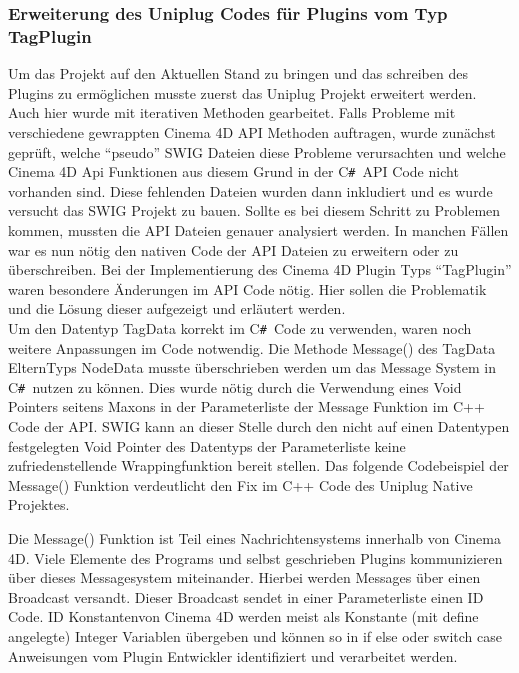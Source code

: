 \documentclass[pagesize, paper=a4, fontsize=12pt, titlepage=true, headings=small, headnosepline, abstractoff, liststotoc, nochapterprefix, plainheadsepline, twoside]{scrreprt}
\newcommand{\CSS}{C\texttt{\# }}
\begin{document}
\subsubsection{Erweiterung des Uniplug Codes für Plugins vom Typ TagPlugin}
Um das Projekt auf den Aktuellen Stand zu bringen und das schreiben des Plugins zu ermöglichen musste zuerst das Uniplug Projekt erweitert werden. Auch hier wurde mit iterativen Methoden gearbeitet. Falls Probleme mit verschiedene gewrappten Cinema 4D API Methoden auftragen, wurde zunächst geprüft, welche “pseudo” SWIG Dateien diese Probleme verursachten und welche Cinema 4D Api Funktionen aus diesem Grund in der \CSS API Code nicht vorhanden sind. Diese fehlenden Dateien wurden dann inkludiert und es wurde versucht das SWIG Projekt zu bauen. Sollte es bei diesem Schritt zu Problemen kommen, mussten die API Dateien genauer analysiert werden. In manchen Fällen war es nun nötig den nativen Code der API Dateien zu erweitern oder zu überschreiben. Bei der Implementierung des Cinema 4D Plugin Typs “TagPlugin” waren besondere Änderungen im API Code nötig. Hier sollen die Problematik und die Lösung dieser aufgezeigt und erläutert werden.
\\


Um den Datentyp TagData korrekt im \CSS Code zu verwenden, waren noch weitere Anpassungen im Code notwendig. Die Methode Message() des TagData ElternTyps NodeData musste überschrieben werden um das Message System in \CSS nutzen zu können. Dies wurde nötig durch die Verwendung eines Void Pointers seitens Maxons in der Parameterliste der Message Funktion im C++ Code der API. SWIG kann an dieser Stelle durch den nicht auf einen Datentypen festgelegten Void Pointer des Datentyps der Parameterliste keine zufriedenstellende Wrappingfunktion bereit stellen. Das folgende Codebeispiel der Message() Funktion verdeutlicht den Fix im C++ Code des Uniplug Native Projektes.

Die Message() Funktion ist Teil eines Nachrichtensystems innerhalb von Cinema 4D. Viele Elemente des Programs und selbst geschrieben Plugins kommunizieren über dieses Messagesystem miteinander. Hierbei werden Messages über einen Broadcast versandt. Dieser Broadcast sendet in einer Parameterliste einen ID Code. ID Konstantenvon Cinema 4D werden meist als Konstante (mit define angelegte) Integer Variablen übergeben und können so in if else oder switch case Anweisungen vom Plugin Entwickler identifiziert und verarbeitet werden.
\end{document}
